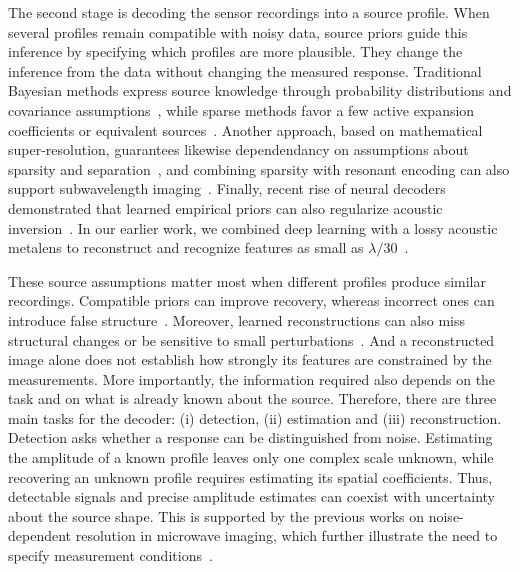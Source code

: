 \documentclass[lineno,pdflatex,sn-nature]{sn-jnl}%
\theoremstyle{thmstyleone}%
\theoremstyle{thmstyletwo}%
\theoremstyle{thmstylethree}%
\begin{document}
The second stage is decoding the sensor recordings into a source profile. When several profiles remain compatible with noisy data, source priors guide this inference by specifying which profiles are more plausible. They change the inference from the data without changing the measured response. Traditional Bayesian methods express source knowledge through probability distributions and covariance assumptions~\cite{antoni2012,stuart2010,pereira2015,caviedes2021}, while sparse methods favor a few active expansion coefficients or equivalent sources~\cite{chardon2012,fernandez2017}. Another approach, based on mathematical super-resolution, guarantees likewise dependendancy on assumptions about sparsity and separation~\cite{donoho1992,candes2014}, and combining sparsity with resonant encoding can also support subwavelength imaging~\cite{mu2022}. Finally, recent rise of neural decoders~\cite{arridge2019,fernandez2023} demonstrated that learned empirical priors can also regularize acoustic inversion~\cite{lobato2024}. In our earlier work, we combined deep learning with a lossy acoustic metalens to reconstruct and recognize features as small as $\lambda/30$~\cite{orazbayev2020}.

These source assumptions matter most when different profiles produce similar recordings. Compatible priors can improve recovery, whereas incorrect ones can introduce false structure~\cite{bhadra2021,gottschling2025}. Moreover, learned reconstructions can also miss structural changes or be sensitive to small perturbations~\cite{antun2020}. And a reconstructed image alone does not establish how strongly its features are constrained by the measurements. More importantly, the information required also depends on the task and on what is already known about the source. Therefore, there are three main tasks for the decoder: (i) detection, (ii) estimation and (iii) reconstruction. Detection asks whether a response can be distinguished from noise. Estimating the amplitude of a known profile leaves only one complex scale unknown, while recovering an unknown profile requires estimating its spatial coefficients. Thus, detectable signals and precise amplitude estimates can  coexist with uncertainty about the source shape. This is supported by the previous works on noise-dependent resolution in microwave imaging, which further illustrate the need to specify measurement conditions~\cite{davy2009}.
\end{document}

